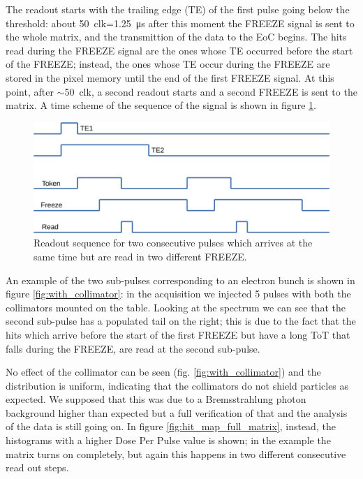    The readout starts with the trailing edge (TE) of the first pulse going below the threshold: about \SI{50}{clk}=\SI{1.25}{\us} after this moment the FREEZE signal is sent to the whole matrix, and the transmittion of the data to the EoC begins.
   The hits read during the FREEZE signal are the ones whose TE occurred before the start of the FREEZE; instead, the ones whose TE occur during the FREEZE are stored in the pixel memory until the end of the first FREEZE signal. At this point, after $\sim$\SI{50}{clk}, a second readout starts and a second FREEZE is sent to the matrix.  
   A time scheme of the sequence of the signal is shown in figure \ref{fig:time_scheme}.
   \begin{figure}
      \centering
      \includegraphics[width=0.8\linewidth]{figures/test_beam/time.pdf}
      \caption{Readout sequence for two consecutive pulses which arrives at the same time but are read in two different FREEZE.}
      \label{fig:time_scheme}
   \end{figure}

   An example of the two sub-pulses corresponding to an electron bunch is shown in figure \ref{fig:with_collimator}: in the acquisition we injected 5 pulses with both the collimators mounted on the table. 
   Looking at the spectrum we can see that the second sub-pulse has a populated tail on the right; this is due to the fact that the hits which arrive before the start of the first FREEZE but have a long ToT that falls during the FREEZE, are read at the second sub-pulse. 
   
   No effect of the collimator can be seen (fig. \ref{fig:with_collimator}) and the distribution is uniform, indicating that the collimators do not shield particles as expected.
   We supposed that this was due to a Bremsstrahlung photon background higher than expected but a full verification of that and the analysis of the data is still going on. 
   In figure \ref{fig:hit_map_full_matrix}, instead, the histograms with a higher Dose Per Pulse value is shown; in the example the matrix turns on completely, but again this happens in two different consecutive read out steps. 

